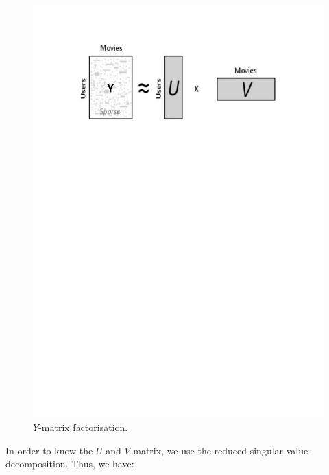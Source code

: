 \documentclass{article}
\begin{document}
\begin{figure}[H]
\centering
  \includegraphics[scale=0.4]{./images/facto.pdf}
  \caption{$Y$-matrix factorisation.}
  \label{fig:facto}
\end{figure}

In order to know the $U$ and $V$ matrix, we use the reduced singular value decomposition. Thus, we have:
\end{document}
